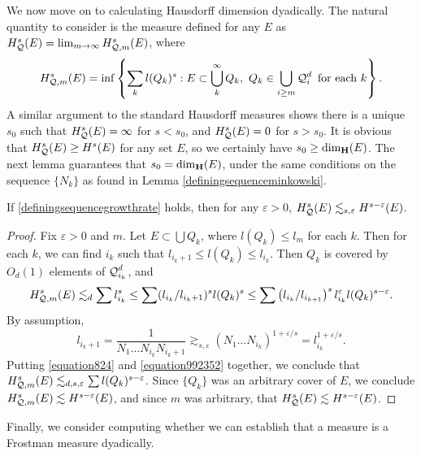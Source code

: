 We now move on to calculating Hausdorff dimension dyadically. The natural quantity to consider is the measure defined for any $E$ as $H^s_{\operatorname{\mathcal{Q}}}(E) = \lim_{m \to \infty} H^s_{\operatorname{\mathcal{Q}},m}(E)$, where
%
\[ H^s_{\DQ,m}(E) = \inf \left\{ \sum_k l(Q_k)^s : E \subset \bigcup_k^\infty Q_k,\ Q_k \in \bigcup_{i \geq m} \DQ_i^d\ \text{for each $k$} \right\}. \]
%
A similar argument to the standard Hausdorff measures shows there is a unique $s_0$ such that $H^s_{\operatorname{\mathcal{Q}}}(E) = \infty$ for $s < s_0$, and $H^s_{\operatorname{\mathcal{Q}}}(E) = 0$ for $s > s_0$. It is obvious that $H^s_{\operatorname{\mathcal{Q}}}(E) \geq H^s(E)$ for any set $E$, so we certainly have $s_0 \geq \operatorname{\dim_{\mathbf{H}}}(E)$. The next lemma guarantees that $s_0 = \operatorname{\dim_{\mathbf{H}}}(E)$, under the same conditions on the sequence $\{ N_k \}$ as found in Lemma \ref{definingsequenceminkowski}.

\begin{lemma} \label{lemma51464}
	If \eqref{definingsequencegrowthrate} holds, then for any $\varepsilon > 0$, $H^s_{\operatorname{\mathcal{Q}}}(E) \lesssim_{s,\varepsilon} H^{s-\varepsilon}(E)$.
\end{lemma}
\begin{proof}
	Fix $\varepsilon > 0$ and $m$. Let $E \subset \bigcup Q_k$, where $l(Q_k) \leq l_m$ for each $k$. Then for each $k$, we can find $i_k$ such that $l_{i_k+1} \leq l(Q_k) \leq l_{i_k}$. Then $Q_k$ is covered by $O_d(1)$ elements of $\operatorname{\mathcal{Q}}_{i_k}^d$, and
	\begin{equation} \label{equation824} H^s_{\operatorname{\mathcal{Q}},m}(E) \lesssim_d \sum l_{i_k}^s \leq \sum (l_{i_k}/l_{i_k+1})^s l(Q_k)^s \leq \sum \left( l_{i_k}/l_{i_{k+1}} \right)^s l_{i_k}^\varepsilon l(Q_k)^{s - \varepsilon}. \end{equation}
	By assumption,
	\begin{equation} \label{equation992352}
		l_{i_k+1} = \frac{1}{N_1 \dots N_{i_k} N_{i_k+1}} \gtrsim_{s,\varepsilon} (N_1 \dots N_{i_k})^{1+ \varepsilon/s} = l_{i_k}^{1 + \varepsilon/s}.
	\end{equation}
	Putting \eqref{equation824} and \eqref{equation992352} together, we conclude that $H^s_{\operatorname{\mathcal{Q}},m}(E) \lesssim_{d,s,\varepsilon} \sum l(Q_k)^{s-\varepsilon}$. Since $\{ Q_k \}$ was an arbitrary cover of $E$, we conclude $H^s_{\operatorname{\mathcal{Q}},m}(E) \lesssim H^{s-\varepsilon}(E)$, and since $m$ was arbitrary, that $H^s_{\operatorname{\mathcal{Q}}}(E) \lesssim H^{s-\varepsilon}(E)$.
\end{proof}

Finally, we consider computing whether we can establish that a measure is a Frostman measure dyadically.

